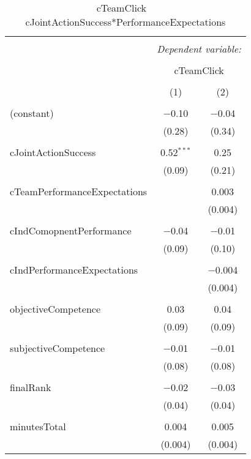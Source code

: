 
\begin{table}[!htbp] \centering 
  \caption{cTeamClick ~ cJointActionSuccess*PerformanceExpectations} 
  \label{} 
\begin{tabular}{@{\extracolsep{5pt}}lcc} 
\\[-1.8ex]\hline 
\hline \\[-1.8ex] 
 & \multicolumn{2}{c}{\textit{Dependent variable:}} \\ 
\cline{2-3} 
\\[-1.8ex] & \multicolumn{2}{c}{cTeamClick} \\ 
\\[-1.8ex] & (1) & (2)\\ 
\hline \\[-1.8ex] 
 (constant) & $-$0.10 & $-$0.04 \\ 
  & (0.28) & (0.34) \\ 
  & & \\ 
 cJointActionSuccess & 0.52$^{***}$ & 0.25 \\ 
  & (0.09) & (0.21) \\ 
  & & \\ 
 cTeamPerformanceExpectations &  & 0.003 \\ 
  &  & (0.004) \\ 
  & & \\ 
 cIndComopnentPerformance & $-$0.04 & $-$0.01 \\ 
  & (0.09) & (0.10) \\ 
  & & \\ 
 cIndPerformanceExpectations &  & $-$0.004 \\ 
  &  & (0.004) \\ 
  & & \\ 
 objectiveCompetence & 0.03 & 0.04 \\ 
  & (0.09) & (0.09) \\ 
  & & \\ 
 subjectiveCompetence & $-$0.01 & $-$0.01 \\ 
  & (0.08) & (0.08) \\ 
  & & \\ 
 finalRank & $-$0.02 & $-$0.03 \\ 
  & (0.04) & (0.04) \\ 
  & & \\ 
 minutesTotal & 0.004 & 0.005 \\ 
  & (0.004) & (0.004) \\ 

\end{tabular}
\end{table}
